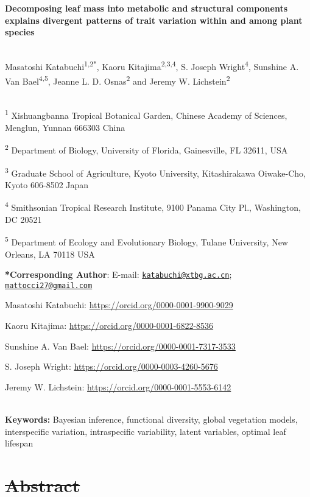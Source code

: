 \documentclass[
  12pt,
  letterpaper,
  DIV=11,
  numbers=noendperiod]{scrartcl}
\author{}
\date{}
\providecommand{\DIFadd}[1]{{\protect\color{blue}\uwave{#1}}} %
\providecommand{\DIFdel}[1]{{\protect\color{red}\sout{#1}}}                      %
\providecommand{\DIFaddbegin}{} %
\providecommand{\DIFaddend}{} %
\providecommand{\DIFdelbegin}{} %
\providecommand{\DIFdelend}{} %
\newcommand{\DIFscaledelfig}{0.5}
\newlength{\DIFdelgraphicswidth} %
\newlength{\DIFdelgraphicsheight} %
\newcommand{\DIFaddincludegraphics}[2][]{{\color{blue}\fbox{\DIFOincludegraphics[#1]{#2}}}} %
\newcommand{\DIFdelincludegraphics}[2][]{%
\sbox{\DIFdelgraphicsbox}{\DIFOincludegraphics[#1]{#2}}%
\settoboxwidth{\DIFdelgraphicswidth}{\DIFdelgraphicsbox} %
\settoboxtotalheight{\DIFdelgraphicsheight}{\DIFdelgraphicsbox} %
\scalebox{\DIFscaledelfig}{%
\parbox[b]{\DIFdelgraphicswidth}{\usebox{\DIFdelgraphicsbox}\\[-\baselineskip] \rule{\DIFdelgraphicswidth}{0em}}\llap{\resizebox{\DIFdelgraphicswidth}{\DIFdelgraphicsheight}{%
\setlength{\unitlength}{\DIFdelgraphicswidth}%
\begin{picture}(1,1)%
\thicklines\linethickness{2pt} %
{\color[rgb]{1,0,0}\put(0,0){\framebox(1,1){}}}%
{\color[rgb]{1,0,0}\put(0,0){\line( 1,1){1}}}%
{\color[rgb]{1,0,0}\put(0,1){\line(1,-1){1}}}%
\end{picture}%
}\hspace*{3pt}}} %
} %
\DeclareRobustCommand{\DIFaddbegin}{\DIFOaddbegin \let\includegraphics\DIFaddincludegraphics} %
\DeclareRobustCommand{\DIFaddend}{\DIFOaddend \let\includegraphics\DIFOincludegraphics} %
\DeclareRobustCommand{\DIFdelbegin}{\DIFOdelbegin \let\includegraphics\DIFdelincludegraphics} %
\DeclareRobustCommand{\DIFdelend}{\DIFOaddend \let\includegraphics\DIFOincludegraphics} %
\begin{document}
\textbf{Decomposing leaf mass into metabolic and structural components
explains divergent patterns of trait variation within and among plant
species}\\
\strut \\
Masatoshi Katabuchi\textsuperscript{1,2*}, Kaoru
Kitajima\textsuperscript{2,3,4}, S. Joseph Wright\textsuperscript{4},
Sunshine A. Van Bael\textsuperscript{4,5}, Jeanne L. D.
Osnas\textsuperscript{2} and Jeremy W. Lichstein\textsuperscript{2}\\
\strut \\
\textsuperscript{1} Xishuangbanna Tropical Botanical Garden, Chinese
Academy of Sciences, Menglun, Yunnan 666303 China

\textsuperscript{2} Department of Biology, University of Florida,
Gainesville, FL 32611, USA

\textsuperscript{3} Graduate School of Agriculture, Kyoto University,
Kitashirakawa Oiwake-Cho, Kyoto 606-8502 Japan

\textsuperscript{4} Smithsonian Tropical Research Institute, 9100 Panama
City Pl., Washington, DC 20521

\textsuperscript{5} Department of Ecology and Evolutionary Biology,
Tulane University, New Orleans, LA 70118 USA

\textbf{*Corresponding Author}: E-mail:
\href{mailto:katabuchi@xtbg.ac.cn}{\nolinkurl{katabuchi@xtbg.ac.cn}};
\href{mailto:mattocci27@gmail.com}{\nolinkurl{mattocci27@gmail.com}}

Masatoshi Katabuchi: \url{https://orcid.org/0000-0001-9900-9029}

Kaoru Kitajima: \url{https://orcid.org/0000-0001-6822-8536}

Sunshine A. Van Bael: \url{https://orcid.org/0000-0001-7317-3533}

S. Joseph Wright: \url{https://orcid.org/0000-0003-4260-5676}

Jeremy W. Lichstein: \url{https://orcid.org/0000-0001-5553-6142}\\
\strut \\
\textbf{Keywords:} Bayesian inference, functional diversity, global
vegetation models, interspecific variation, intraspecific variability,
latent variables, optimal leaf lifespan

\DIFdelbegin \section{\DIFdel{Abstract}}%
\addtocounter{section}{-1}%
\DIFdelend \DIFaddbegin \textbf{\DIFadd{Abstract}}
\DIFaddend 
\end{document}
